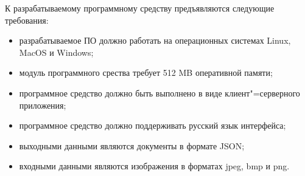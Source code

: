 К разрабатываемому программному средству предъявляются следующие требования:
\begin{itemize}
  \item разрабатываемое ПО должно работать на операционных системах Linux, MacOS и Windows;
  \item модуль программного срества требует 512 MB оперативной памяти;
  \item программное средство должно быть выполнено в виде клиент"=серверного приложения;
  \item программное средство должно поддерживать русский язык \mbox{интерфейса;}
  \item выходными данными являются документы в формате JSON;
  \item входными данными являются изображения в форматах jpeg, bmp и png.
\end{itemize}  